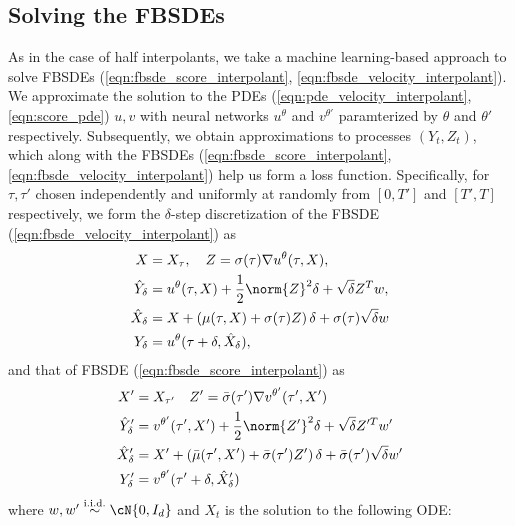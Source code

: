 \subsection{Solving the FBSDEs}
As in the case of half interpolants, we take a machine learning-based approach to solve FBSDEs (\ref{eqn:fbsde_score_interpolant}, \ref{eqn:fbsde_velocity_interpolant}). We approximate the solution to the PDEs (\ref{eqn:pde_velocity_interpolant}, \ref{eqn:score_pde}) $u,v$ with neural networks $u^\theta$ and $v^{\theta'}$ paramterized by $\theta$ and $\theta'$ respectively. Subsequently, we obtain approximations to processes $(Y_t, Z_t)$, which along with the FBSDEs (\ref{eqn:fbsde_score_interpolant},\ref{eqn:fbsde_velocity_interpolant}) help us form a loss function. Specifically, for $\tau,\tau'$ chosen independently and uniformly at randomly from $[0,T']$ and $[T',T]$ respectively,  we form the $\delta$-step discretization of the FBSDE (\ref{eqn:fbsde_velocity_interpolant}) as 
\begin{align*}
       X &= X_\tau,\quad Z = \sigma(\tau)\nabla u^\theta(\tau,X),\\
       \hat{Y}_\delta &= u^\theta(\tau,X)+\frac{1}{2}\norm{Z}^2\delta+\sqrt{\delta}Z^Tw,\\
    \hat{X}_\delta &= X + \left(\mu(\tau,X)+\sigma(\tau)Z\right)\delta+\sigma(\tau)\sqrt{\delta}w\\
    Y_\delta &= u^\theta(\tau+\delta,\hat{X}_\delta),
\end{align*}
and that of FBSDE (\ref{eqn:fbsde_score_interpolant}) as
\begin{align*}
       X' &= X_{\tau'}\quad Z' = \bar{\sigma}(\tau')\nabla v^{\theta'}(\tau',X')\\
       \hat{Y}'_{\delta} &= v^{\theta'}(\tau',X')+\frac{1}{2}\norm{Z'}^2\delta+\sqrt{\delta}Z'^Tw'\\
        \hat{X}'_{\delta} &= X'+ \left(\bar{\mu}(\tau',X')+\bar{\sigma}(\tau')Z'\right)\delta+\bar{\sigma}(\tau')\sqrt{\delta}w'\\
    Y'_{\delta} &= v^{\theta'}(\tau'+\delta,\hat{X}'_{\delta})\\
\end{align*}
where  $w,w'\overset{\text{i.i.d.}}{\sim}\cN{0,I_d}$ and $X_t$ is the solution to the following ODE:
